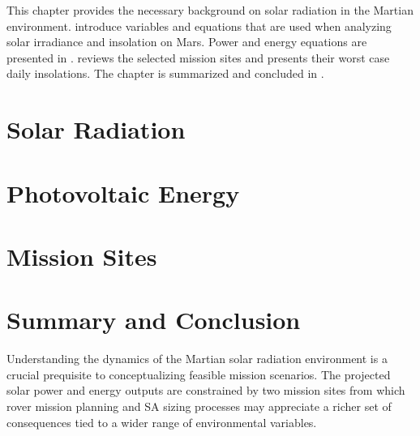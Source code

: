 This chapter provides the necessary background on solar radiation in the Martian environment.  introduce variables and equations that are used when analyzing solar irradiance and insolation on Mars. Power and energy equations are presented in .  reviews the selected mission sites and presents their worst case daily insolations. The chapter is summarized and concluded in .

\section{Solar Radiation}
\label{sec:MarsSolarEnergy:SolarRadiation}


\clearpage
\section{Photovoltaic Energy}
\label{sec:MarsSolarEnergy:PhotovoltaicEnergy}


\clearpage
\section{Mission Sites}
\label{sec:MarsSolarEnergy:MissionSites}


\section{Summary and Conclusion}
\label{sec:MarsSolarEnergy:SummaryAndConclusion}
Understanding the dynamics of the Martian solar radiation environment is a crucial prequisite to  conceptualizing feasible mission scenarios. The projected solar power and energy outputs are constrained by two mission sites from which rover mission planning and \ac{SA} sizing processes may appreciate a richer set of consequences tied to a wider range of environmental variables.
